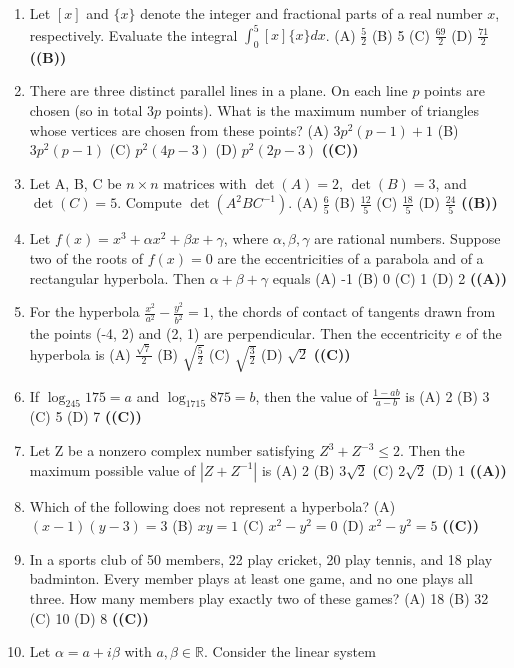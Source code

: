 \documentclass{article}
\begin{document}
\begin{enumerate}
(A) $\frac{1}{\sqrt{2}}$
(B) $\sqrt{2}$
(C) $\sqrt{3}$
(D) $2\sqrt{2}$ \hfill \textbf{((B))}
\item Let $[x]$ and $\{x\}$ denote the integer and fractional parts of a real number $x$, respectively. Evaluate the integral $\int_{0}^{5} [x] \{x\}dx$.
(A) $\frac{5}{2}$
(B) 5
(C) $\frac{69}{2}$
(D) $\frac{71}{2}$ \hfill \textbf{((B))}
\item There are three distinct parallel lines in a plane. On each line $p$ points are chosen (so in total $3p$ points). What is the maximum number of triangles whose vertices are chosen from these points?
(A) $3p^2(p-1) + 1$
(B) $3 p^2(p-1)$
(C) $p^2(4p - 3)$
(D) $p^2(2p - 3)$ \hfill \textbf{((C))}
\item Let A, B, C be $n \times n$ matrices with $\det(A) = 2$, $\det(B) = 3$, and $\det(C) = 5$. Compute $\det (A^2 BC^{-1})$.
(A) $\frac{6}{5}$
(B) $\frac{12}{5}$
(C) $\frac{18}{5}$
(D) $\frac{24}{5}$ \hfill \textbf{((B))}
\item Let $f(x) = x^3 + \alpha x^2 + \beta x + \gamma$, where $\alpha, \beta, \gamma$ are rational numbers. Suppose two of the roots of $f(x) = 0$ are the eccentricities of a parabola and of a rectangular hyperbola. Then $\alpha + \beta + \gamma$ equals
(A) -1
(B) 0
(C) 1
(D) 2 \hfill \textbf{((A))}
\item For the hyperbola $\frac{x^2}{a^2} - \frac{y^2}{b^2} = 1$, the chords of contact of tangents drawn from the points (-4, 2) and (2, 1) are perpendicular. Then the eccentricity $e$ of the hyperbola is
(A) $\frac{\sqrt{7}}{2}$
(B) $\sqrt{\frac{5}{2}}$
(C) $\sqrt{\frac{3}{2}}$
(D) $\sqrt{2}$ \hfill \textbf{((C))}
\item If $\log_{245} 175 = a$ and $\log_{1715} 875 = b$, then the value of $\frac{1-ab}{a-b}$ is
(A) 2
(B) 3
(C) 5
(D) 7 \hfill \textbf{((C))}
\item Let Z be a nonzero complex number satisfying $Z^3 + Z^{-3} \le 2$. Then the maximum possible value of $| Z + Z^{-1}|$ is
(A) 2
(B) $3\sqrt{2}$
(C) $2\sqrt{2}$
(D) 1 \hfill \textbf{((A))}
\item Which of the following does not represent a hyperbola?
(A) $(x - 1)(y - 3) = 3$
(B) $xy = 1$
(C) $x^2 - y^2 = 0$
(D) $x^2 - y^2 = 5$ \hfill \textbf{((C))}
\item In a sports club of 50 members, 22 play cricket, 20 play tennis, and 18 play badminton. Every member plays at least one game, and no one plays all three. How many members play exactly two of these games?
(A) 18
(B) 32
(C) 10
(D) 8 \hfill \textbf{((C))}
\item Let $\alpha = a + i\beta$ with $a, \beta \in \mathbb{R}$. Consider the linear system

\end{enumerate}
\end{document}
